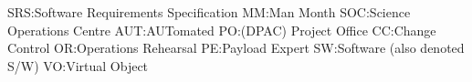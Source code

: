 SRS:Software Requirements Specification
MM:Man Month
SOC:Science Operations Centre
AUT:AUTomated
PO:(DPAC) Project Office
CC:Change Control
OR:Operations Rehearsal
PE:Payload Expert
SW:Software (also denoted S/W)
VO:Virtual Object

